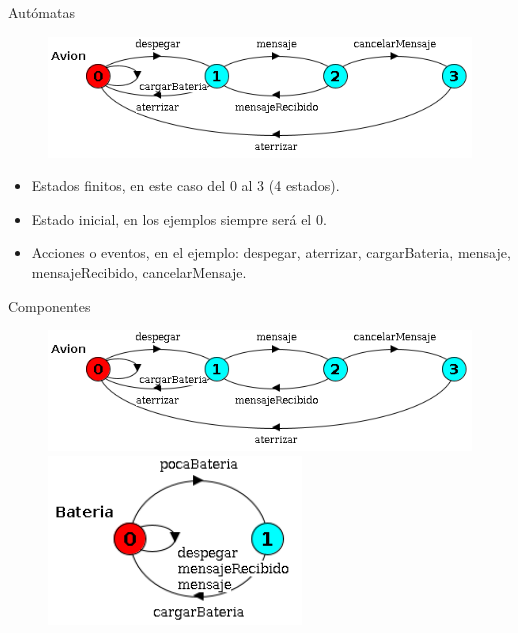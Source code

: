 \begin{frame}{Autómatas} 
    \begin{figure}
     \includegraphics[width=\textwidth]{figures/avion.png}
    \end{figure}

    \begin{itemize}
     \item Estados finitos, en este caso del 0 al 3 (4 estados).
     \item Estado inicial, en los ejemplos siempre será el 0.
     \item Acciones o eventos, en el ejemplo: despegar, aterrizar, cargarBateria, mensaje, mensajeRecibido, cancelarMensaje.
    \end{itemize}
    
\end{frame}
\begin{frame}{Componentes}
    \begin{figure}
     \includegraphics[width=\textwidth]{figures/avion.png}
     \includegraphics[width=0.6\textwidth]{figures/bateria.png}
    \end{figure}
\end{frame}

